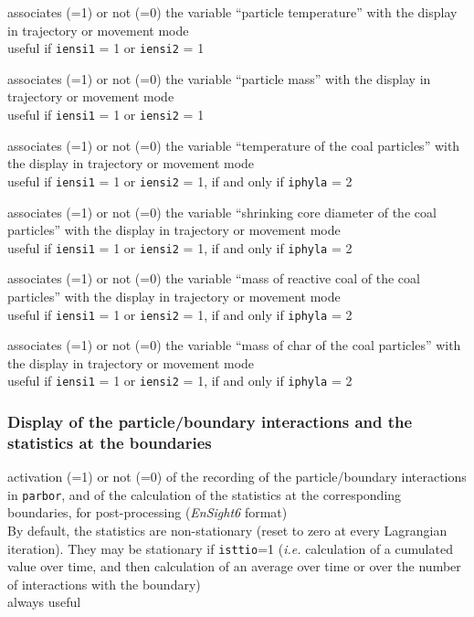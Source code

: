 {associates (=1) or not (=0) the variable ``particle temperature''
with the display in trajectory or movement mode\\
useful if \texttt{iensi1} = 1 or \texttt{iensi2} = 1}

{associates (=1) or not (=0) the variable ``particle mass''
with the display in trajectory or movement mode\\
useful if \texttt{iensi1} = 1 or \texttt{iensi2} = 1}

{associates (=1) or not (=0) the variable ``temperature of the coal particles''
with the display in trajectory or movement mode\\
useful if \texttt{iensi1} = 1 or \texttt{iensi2} = 1, if and only
if \texttt{iphyla} = 2}

{associates (=1) or not (=0) the variable ``shrinking core diameter of
the coal particles'' with the display in trajectory or movement mode\\
useful if \texttt{iensi1} = 1 or \texttt{iensi2} = 1, if and only if
\texttt{iphyla} = 2}

{associates (=1) or not (=0) the variable ``mass of reactive coal of the
coal particles'' with the display in trajectory or movement mode\\
useful if \texttt{iensi1} = 1 or \texttt{iensi2} = 1, if and only if
\texttt{iphyla} = 2}

{associates (=1) or not (=0) the variable ``mass of char of the
coal particles'' with the display in trajectory or movement mode\\
useful if \texttt{iensi1} = 1 or \texttt{iensi2} = 1, if and only if
\texttt{iphyla} = 2}

\subsubsection{Display of the particle/boundary interactions and the statistics at the boundaries}

{activation (=1) or not (=0) of the recording of the particle/boundary
interactions in  \texttt{parbor}, and of the calculation of the
statistics at the corresponding boundaries, for post-processing
(\textit{EnSight6} format)\\
By default, the statistics are non-stationary (reset to zero at every
Lagrangian iteration). They may be stationary if \texttt{isttio}=1 ({\em i.e.}
calculation of a cumulated value over time, and then calculation of an
average over time or over the number of interactions with the boundary)\\
always useful}

